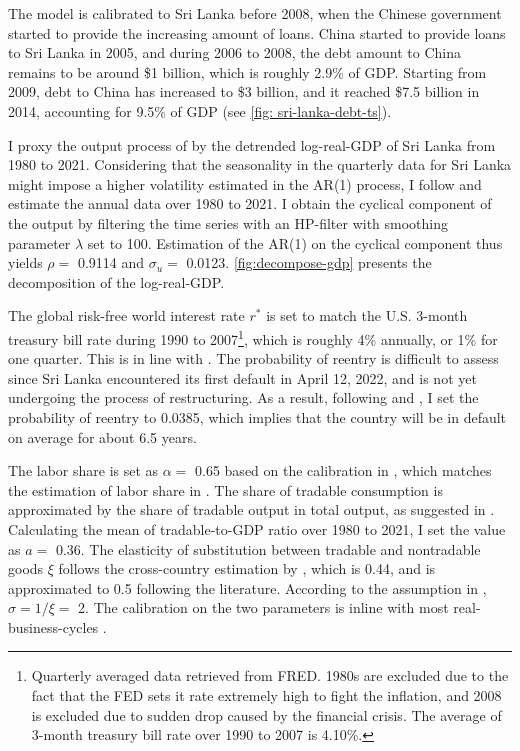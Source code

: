 The model is calibrated to Sri Lanka before 2008, when the Chinese government started to provide the increasing amount of loans.
China started to provide loans to Sri Lanka in 2005, and during 2006 to 2008, the debt amount to China remains to be around \$1 billion, which is roughly 2.9\% of GDP. Starting from 2009, debt to China has increased to \$3 billion, and it reached \$7.5 billion in 2014, accounting for 9.5\% of GDP
(see \autoref{fig: sri-lanka-debt-ts}).

I proxy the output process of  by the detrended log-real-GDP of Sri Lanka from 1980 to 2021. Considering that the seasonality in the quarterly data for Sri Lanka might impose a higher volatility estimated in the AR(1) process, I follow \citet{Hinrichsen_2020-chapter4} and estimate the annual data over 1980 to 2021. I obtain the cyclical component of the output by filtering the time series with an HP-filter with smoothing parameter $\lambda$ set to 100.
Estimation of the AR(1) on the cyclical component thus yields $\rho = $ 0.9114 and $\sigma_u = $ 0.0123\footnotemark{}. \autoref{fig:decompose-gdp} presents the decomposition of the log-real-GDP.

The global risk-free world interest rate $r^*$ is set to match the U.S. 3-month treasury bill rate during 1990 to 2007\footnote{
    Quarterly averaged data retrieved from FRED. 1980s are excluded due to the fact that the FED sets it rate extremely high to fight the inflation, and 2008 is excluded due to sudden drop caused by the financial crisis. The average of 3-month treasury bill rate over 1990 to 2007 is 4.10\%.
}, which is roughly 4\% annually, or 1\% for one quarter. This is in line with \citet{Chatterjee-12}.
The probability of reentry is difficult to assess since Sri Lanka encountered its first default in April 12, 2022, and is not yet undergoing the process of restructuring. As a result, following \citet*{Chatterjee-12} and \citet*{Hinrichsen_2020-chapter4}, I set the probability of reentry to 0.0385, which implies that the country will be in default on average for about 6.5 years.

The labor share is set as $\alpha=$ 0.65 based on the calibration in \citet*{Jegajeevan-Sri-Lanka-DSGE}, which matches the estimation of labor share in \citet{duma2007sri}. The share of tradable consumption is approximated by the share of tradable output in total output, as suggested in \citet{Uribe-Schmitt-Grohe-textbook}. Calculating the mean of tradable-to-GDP ratio over 1980 to 2021, I set the value as $a =$ 0.36. The elasticity of substitution between tradable and nontradable goods $\xi$ follows the cross-country estimation by \citet*{Stockman-Tesar-95}, which is 0.44, and is approximated to 0.5 following the literature. According to the assumption in , $\sigma=1/\xi=$ 2. The calibration on the two parameters is inline with most real-business-cycles \citep{Uribe-Schmitt-Grohe-textbook,Na-18}.

